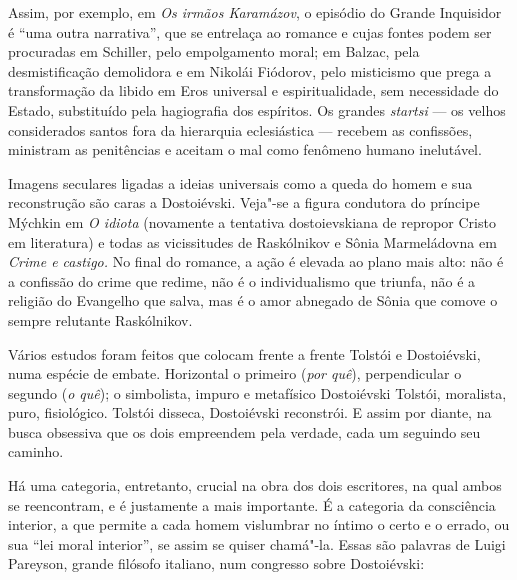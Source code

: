 {{Assim, por exemplo, em \emph{Os irmãos Karamázov}, o episódio do Grande
Inquisidor é ``uma outra narrativa'', que se entrelaça ao romance e
cujas fontes podem ser procuradas em Schiller, pelo empolgamento moral;
em Balzac, pela desmistificação demolidora e em Nikolái Fiódorov, pelo
misticismo que prega a transformação da libido em Eros universal e
espiritualidade, sem necessidade do Estado, substituído pela hagiografia
dos espíritos. Os grandes \emph{startsi} --- os velhos considerados
santos fora da hierarquia eclesiástica --- recebem as confissões, ministram as penitências e aceitam o mal
como fenômeno humano inelutável.

Imagens seculares ligadas a ideias universais como a queda do homem e
sua reconstrução são caras a Dostoiévski. Veja"-se a figura condutora do
príncipe Mýchkin em \emph{O idiota} (novamente a tentativa
dostoievskiana de repropor Cristo em literatura) e todas as vicissitudes
de Raskólnikov e Sônia Marmeládovna em \emph{Crime e castigo.} No final
do romance, a ação é elevada ao plano mais alto: não é a confissão do
crime que redime, não é o individualismo que triunfa, não é a religião
do Evangelho que salva, mas é o amor abnegado de Sônia que comove o
sempre relutante Raskólnikov.

Vários estudos foram feitos que colocam frente a frente Tolstói e
Dostoiévski, numa espécie de embate. Horizontal o primeiro (\emph{por quê}),
perpendicular o segundo (\emph{o quê}); o simbolista, impuro e metafísico
Dostoiévski  Tolstói, moralista, puro, fisiológico. Tolstói disseca, Dostoiévski reconstrói. E assim por diante,
na busca obsessiva que os dois empreendem pela verdade, cada um seguindo
seu caminho.

Há uma categoria, entretanto, crucial na obra dos dois escritores, na
qual ambos se reencontram, e é justamente a mais importante. É a
categoria da consciência interior, a que permite a cada homem vislumbrar
no íntimo o certo e o errado, ou sua ``lei moral interior'', se assim
se quiser chamá"-la. Essas são palavras de Luigi Pareyson, grande
filósofo italiano, num congresso sobre Dostoiévski: 

}}
